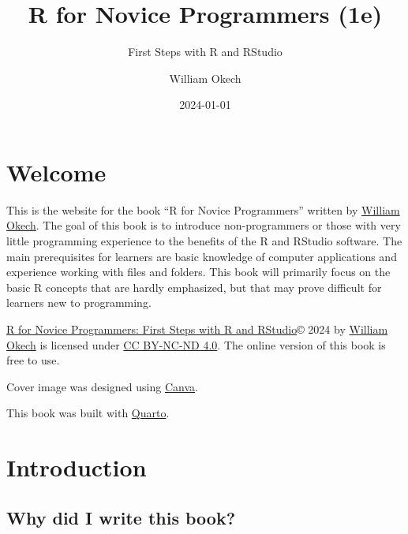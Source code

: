 \documentclass[
  letterpaper,
  DIV=11,
  numbers=noendperiod]{scrreprt}
\title{R for Novice Programmers (1e)}
\subtitle{First Steps with R and RStudio}
\author{William Okech}
\date{2024-01-01}
\renewcommand*\contentsname{Table of contents}
\newcommand\contentsname{Table of contents}
\begin{document}
\maketitle

\renewcommand*\contentsname{Table of contents}
{
\hypersetup{linkcolor=}
\setcounter{tocdepth}{2}
\tableofcontents
}
\listoffigures
\listoftables
{}

\chapter*{Welcome}\label{welcome}


This is the website for the book ``R for Novice Programmers'' written by
\href{https://www.williamokech.com}{William Okech}. The goal of this
book is to introduce non-programmers or those with very little
programming experience to the benefits of the R and RStudio software.
The main prerequisites for learners are basic knowledge of computer
applications and experience working with files and folders. This book
will primarily focus on the basic R concepts that are hardly emphasized,
but that may prove difficult for learners new to programming.

\href{https://wokech.github.io/r4novice/}{R for Novice Programmers:
First Steps with R and RStudio}© 2024 by
\href{https://www.williamokech.com/}{William Okech} is licensed under
\href{http://creativecommons.org/licenses/by-nc-nd/4.0/?ref=chooser-v1}{CC
BY-NC-ND 4.0}. The online version of this book is free to use.

Cover image was designed using \href{https://www.canva.com/}{Canva}.

This book was built with \href{https://quarto.org/}{Quarto}.


\chapter*{Introduction}\label{introduction}


\section*{Why did I write this book?}\label{why-did-i-write-this-book}
\end{document}
